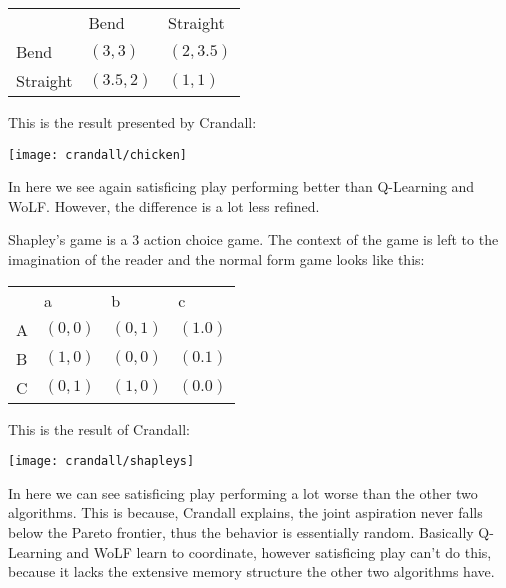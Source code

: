 \begin{tabular}{lll}
              & Bend & Straight \\
    Bend & $(3,3)$     & $(2,3.5)$  \\
    Straight & $(3.5,2)$     & $(1,1)$  \\
\end{tabular}

\cleared This is the result presented by Crandall:

\noindent
\texttt{[image: crandall/chicken]}

\cleared In here we see again satisficing play performing better than Q-Learning and
WoLF. However, the difference is a lot less refined.

\cleared Shapley's game is a 3 action choice game. The context of the game is left to
the imagination of the reader and the normal form game looks like this:

\begin{tabular}{llll}
              & a & b & c \\
    A & $(0,0)$ & $(0,1)$     & $(1.0)$  \\
    B & $(1,0)$ & $(0,0)$     & $(0.1)$  \\
    C & $(0,1)$ & $(1,0)$     & $(0.0)$  \\
\end{tabular}

\cleared This is the result of Crandall:

\noindent
\texttt{[image: crandall/shapleys]}

\cleared In here we can see satisficing play performing a lot worse than the other two
algorithms. This is because, Crandall explains, the joint aspiration never
falls below the Pareto frontier, thus the behavior is essentially random.
Basically Q-Learning and WoLF learn to coordinate, however satisficing play
can't do this, because it lacks the extensive memory structure the other two
algorithms have.

\noindent
{}

